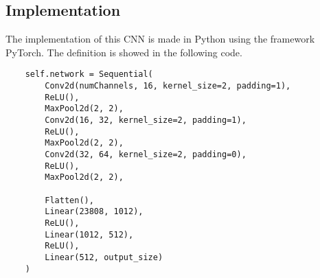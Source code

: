 \subsection{Implementation}
The implementation of this CNN is made in Python using the framework PyTorch. The definition is showed in the following code.\\
\begin{lstlisting}
	self.network = Sequential(
		Conv2d(numChannels, 16, kernel_size=2, padding=1),
		ReLU(),
		MaxPool2d(2, 2),
		Conv2d(16, 32, kernel_size=2, padding=1),
		ReLU(),
		MaxPool2d(2, 2),
		Conv2d(32, 64, kernel_size=2, padding=0),
		ReLU(),
		MaxPool2d(2, 2),
		
		Flatten(),
		Linear(23808, 1012),
		ReLU(),
		Linear(1012, 512),
		ReLU(),
		Linear(512, output_size)
	)
\end{lstlisting}
